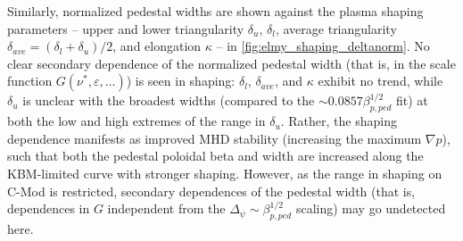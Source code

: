 Similarly, normalized pedestal widths are shown against the plasma shaping parameters -- upper and lower triangularity $\delta_u$, $\delta_l$, average triangularity $\delta_{ave} = (\delta_l + \delta_u)/2$, and elongation $\kappa$ -- in \cref{fig:elmy_shaping_deltanorm}.  No clear secondary dependence of the normalized pedestal width (that is, in the scale function $G(\nu^*,\varepsilon,...)$) is seen in shaping: $\delta_l$, $\delta_{ave}$, and $\kappa$ exhibit no trend, while $\delta_u$ is unclear with the broadest widths (compared to the $\sim 0.0857 \beta_{p,ped}^{1/2}$ fit) at both the low and high extremes of the range in $\delta_u$.  Rather, the shaping dependence manifests as improved MHD stability (increasing the maximum $\nabla p$), such that both the pedestal poloidal beta and width are increased along the KBM-limited curve with stronger shaping.  However, as the range in shaping on C-Mod is restricted, secondary dependences of the pedestal width (that is, dependences in $G$ independent from the $\Delta_\psi \sim \beta_{p,ped}^{1/2}$ scaling) may go undetected here.

\begin{figure}[t]
 \pushtooutside
\end{figure}

